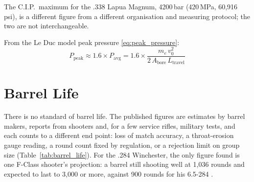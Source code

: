 \documentclass[11pt,twoside,openright]{report}
\begin{document}
The C.I.P.\ maximum for the .338 Lapua Magnum, 4200\,bar (420\,MPa, 60{,}916\,psi), is a different figure from a different organisation and measuring protocol; the two are not interchangeable.

From the Le Duc model peak pressure \eqref{eq:peak_pressure}:
\begin{equation}
  P_{\mathrm{peak}} \approx 1.6 \times P_{\mathrm{avg}}
  = 1.6 \times \frac{m_e\,v_0^2}{2\,A_{\mathrm{bore}}\,L_{\mathrm{travel}}}
  \label{eq:pressure_estimate}
\end{equation}

\section{Barrel Life}

There is no standard of barrel life. The published figures are estimates by barrel makers, reports from shooters and, for a few service rifles, military tests, and each counts to a different end point: loss of match accuracy, a throat-erosion gauge reading, a round count fixed by regulation, or a rejection limit on group size (Table~\ref{tab:barrel_life}). For the .284 Winchester, the only figure found is one F-Class shooter's projection: a barrel still shooting well at 1,036 rounds and expected to last to 3,000 or more, against 900 rounds for his 6.5-284 \citep{ballard2008_284}.
\end{document}

